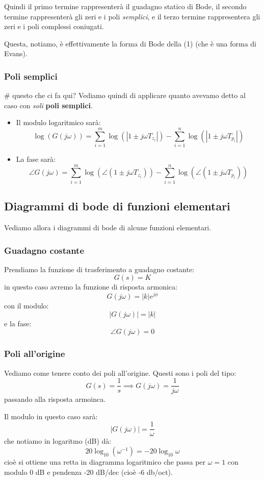 \documentclass[a4paper,11pt]{article}
\begin{document}
Quindi il primo termine rappresenterà il guadagno statico di Bode, il secondo termine rappresenterà gli zeri e i poli \textit{semplici}, e il terzo termine rappresentera gli zeri e i poli complessi coniugati.

Questa, notiamo, è effettivamente la forma di Bode della (1) (che è una forma di Evans). 

\subsubsection{Poli semplici} # questo che ci fa qui?
Vediamo quindi di applicare quanto avevamo detto al caso con \textit{soli} \textbf{poli semplici}.
\begin{itemize}
	\item 
Il modulo logaritmico sarà:
$$
\log \left( G(j \omega) \right) = \sum_{i = 1}^{m} \log \left( |1 \pm j \omega T_{z_i}| \right) - \sum_{i = 1}^{n} \log \left( |1 \pm j \omega T_{p_i}| \right)
$$
	\item 
La fase sarà:
$$
\angle G(j \omega) = \sum_{i = 1}^{m} \log \left( \angle \left( 1 \pm j \omega T_{z_i} \right) \right) - \sum_{i = 1}^{n} \log \left( \angle \left( 1 \pm j \omega T_{p_i} \right) \right)
$$
\end{itemize}


\subsection{Diagrammi di bode di funzioni elementari}
Vediamo allora i diagrammi di bode di alcune funzioni elementari.

\subsubsection{Guadagno costante}
Prendiamo la funzione di trasferimento a guadagno costante:
$$
G(s) = K
$$
in questo caso avremo la funzione di risposta armonica:
$$
G(j \omega) = |k| e^{j \phi}
$$
con il modulo:
$$
|G(j \omega)| = |k|
$$
e la fase:
$$
\angle G(j \omega) = 0 
$$

\subsubsection{Poli all'origine}
Vediamo come tenere conto dei poli all'origine.
Questi sono i poli del tipo:
$$
G(s) = \frac{1}{s} \implies G(j \omega) = \frac{1}{j\omega}
$$
passando alla risposta armoinca.

Il modulo in questo caso sarà:
$$
|G(j\omega)| = \frac{1}{\omega} 
$$
che notiamo in logaritmo (dB) dà:
$$
20 \log_{10} \left( \omega^{-1} \right) = - 20 \log_{10} \omega
$$
cioè si ottiene una retta in diagramma logaritmico che passa per $\omega =1$ con modulo 0 dB e pendenza -20 dB/dec (cioè -6 db/oct).
\end{document}
